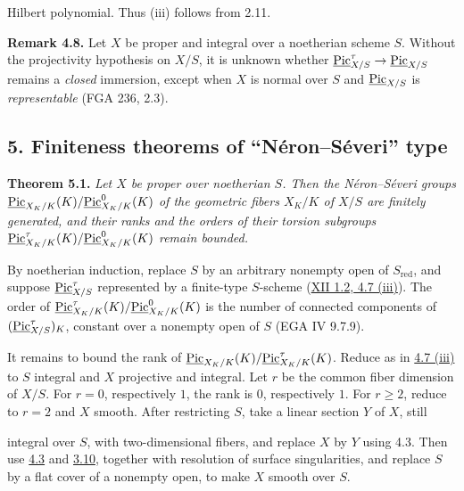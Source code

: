Hilbert polynomial. Thus (iii) follows from 2.11.

\textbf{Remark 4.8.} Let \(X\) be proper and integral over a noetherian
scheme \(S\). Without the projectivity hypothesis on \(X/S\), it is
unknown whether
\(\underline{\operatorname{Pic}}^{\tau}_{X/S}\to\underline{\operatorname{Pic}}_{X/S}\) remains a
\emph{closed} immersion, except when \(X\) is normal over \(S\) and
\(\underline{\operatorname{Pic}}_{X/S}\) is \emph{representable} (FGA 236, 2.3).

\subsection*{5. Finiteness theorems of ``N\'eron--S\'everi'' type}

\textbf{Theorem 5.1.} \emph{Let \(X\) be proper over noetherian \(S\).
Then the N\'eron--S\'everi groups
\(\underline{\operatorname{Pic}}_{X_K/K}(K)/\underline{\operatorname{Pic}}^0_{X_K/K}(K)\) of the
geometric fibers \(X_K/K\) of \(X/S\) are finitely generated, and their
ranks and the orders of their torsion subgroups
\(\underline{\operatorname{Pic}}^\tau_{X_K/K}(K)/\underline{\operatorname{Pic}}^0_{X_K/K}(K)\)
remain bounded.}

By noetherian induction, replace \(S\) by an arbitrary nonempty open of
\(S_{\mathrm{red}}\), and suppose
\(\underline{\operatorname{Pic}}^{\tau}_{X/S}\) represented by a finite-type
\(S\)-scheme (\hyperlink{sga6.e12.cor.1-2}{XII 1.2},\hyperlink{sga6.e13.thm.4-7}{ 4.7 (iii)}). The order of
\(\underline{\operatorname{Pic}}^\tau_{X_K/K}(K)/\underline{\operatorname{Pic}}^0_{X_K/K}(K)\)
is the number of connected components of
\((\underline{\operatorname{Pic}}^{\tau}_{X/S})_K\), constant over a nonempty open of
\(S\) (EGA IV 9.7.9).

It remains to bound the rank of
\(\underline{\operatorname{Pic}}_{X_K/K}(K)/\underline{\operatorname{Pic}}^\tau_{X_K/K}(K)\).
Reduce as in \hyperlink{sga6.e13.thm.4-7}{4.7 (iii)} to
\(S\) integral and \(X\) projective and integral. Let \(r\) be the common
fiber dimension of \(X/S\). For \(r=0\), respectively \(1\), the rank is \(0\),
respectively \(1\). For \(r\ge2\), reduce to \(r=2\) and \(X\) smooth.
After restricting \(S\), take a linear section \(Y\) of \(X\), still

integral over \(S\), with two-dimensional fibers, and replace \(X\) by
\(Y\) using 4.3. Then use \hyperlink{sga6.e13.lem.4-3}{4.3} and \hyperlink{sga6.e13.rem.3-10}{3.10}, together with resolution of
surface singularities, and replace \(S\) by a flat cover of a nonempty
open, to make \(X\) smooth over \(S\).


